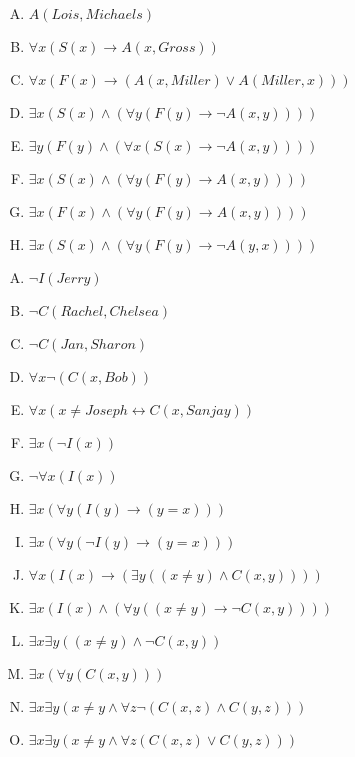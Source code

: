 {{        %
        \begin{practices}
            \begin{enumerate}[A.]
                \item $A(Lois, Michaels)$
                \item $\forall x (S(x) \rightarrow A(x, Gross))$
                \item $\forall x (F(x) \rightarrow (A(x, Miller) \vee A(Miller, x)))$
                \item $\exists x (S(x) \wedge (\forall y (F(y) \rightarrow \neg A(x, y))))$
                \item $\exists y (F(y) \wedge (\forall x (S(x) \rightarrow \neg A(x, y))))$
                \item $\exists x (S(x) \wedge (\forall y (F(y) \rightarrow A(x, y))))$
                \item $\exists x (F(x) \wedge (\forall y (F(y) \rightarrow A(x, y))))$
                \item $\exists x (S(x) \wedge (\forall y (F(y) \rightarrow \neg A(y, x))))$
            \end{enumerate}
        \end{practices}

        \begin{practices}
            \begin{enumerate}[A.]
                \item $\neg I(Jerry)$
                \item $\neg C(Rachel, Chelsea)$
                \item $\neg C(Jan, Sharon)$
                \item $\forall x \neg (C(x, Bob))$
                \item $\forall x (x \neq Joseph \leftrightarrow C(x, Sanjay))$
                \item $\exists x (\neg I(x))$
                \item $\neg \forall x (I(x))$
                \item $\exists x (\forall y (I(y) \rightarrow (y = x)))$
                \item $\exists x (\forall y (\neg I(y) \rightarrow (y = x)))$
                \item $\forall x (I(x) \rightarrow (\exists y ((x \neq y) \wedge C(x, y))))$
                \item $\exists x (I(x) \wedge (\forall y ((x \neq y) \rightarrow \neg C(x, y))))$
                \item $\exists x \exists y ((x \neq y) \wedge \neg C(x, y))$
                \item $\exists x (\forall y (C(x, y)))$
                \item $\exists x \exists y (x \neq y \wedge \forall z \neg (C(x, z) \wedge C(y, z)))$
                \item $\exists x \exists y (x \neq y \wedge \forall z (C(x, z) \vee C(y, z)))$
            \end{enumerate}
        \end{practices}

}}
